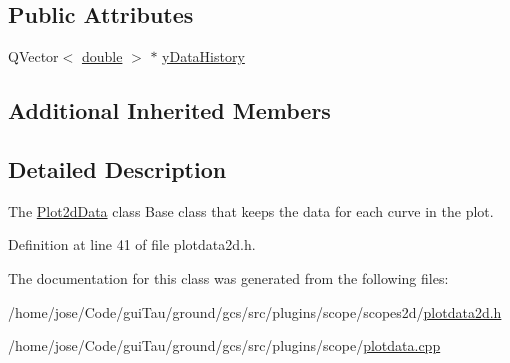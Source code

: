 \subsection*{Public Attributes}
\begin{DoxyCompactItemize}
\item 
Q\-Vector$<$ \hyperlink{_super_l_u_support_8h_a8956b2b9f49bf918deed98379d159ca7}{double} $>$ $\ast$ \hyperlink{group___scope_plugin_ga3f05450290135f9d3b69ab0119718f11}{y\-Data\-History}
\end{DoxyCompactItemize}
\subsection*{Additional Inherited Members}


\subsection{Detailed Description}
The \hyperlink{class_plot2d_data}{Plot2d\-Data} class Base class that keeps the data for each curve in the plot. 

Definition at line 41 of file plotdata2d.\-h.



The documentation for this class was generated from the following files\-:\begin{DoxyCompactItemize}
\item 
/home/jose/\-Code/gui\-Tau/ground/gcs/src/plugins/scope/scopes2d/\hyperlink{plotdata2d_8h}{plotdata2d.\-h}\item 
/home/jose/\-Code/gui\-Tau/ground/gcs/src/plugins/scope/\hyperlink{plotdata_8cpp}{plotdata.\-cpp}\end{DoxyCompactItemize}
